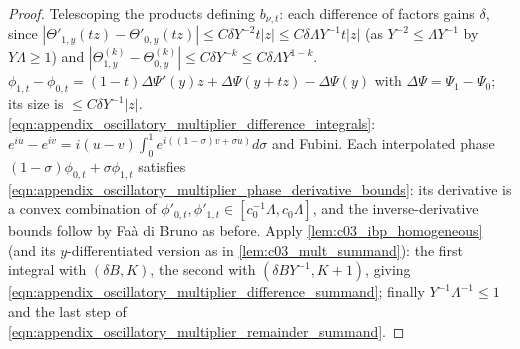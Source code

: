\begin{proof}
  Telescoping the products defining $b_{\nu,t}$: each difference of factors gains $\delta$, since $|\Theta'_{1,y}(tz)-\Theta'_{0,y}(tz)|\le C\delta Y^{-2}t|z|\le C\delta\Lambda Y^{-1}t|z|$ (as $Y^{-2}\le\Lambda Y^{-1}$ by $Y\Lambda\ge1$) and $|\Theta^{(k)}_{1,y}-\Theta^{(k)}_{0,y}|\le C\delta Y^{-k}\le C\delta\Lambda Y^{1-k}$.
  $\phi_{1,t}-\phi_{0,t}=(1-t)\Delta\Psi'(y)z+\Delta\Psi(y+tz)-\Delta\Psi(y)$ with $\Delta\Psi=\Psi_1-\Psi_0$; its size is $\le C\delta Y^{-1}|z|$.
  \eqref{eqn:appendix_oscillatory_multiplier_difference_integrals}: $e^{iu}-e^{iv}=i(u-v)\int_0^1e^{i((1-\sigma)v+\sigma u)}d\sigma$ and Fubini.
  Each interpolated phase $(1-\sigma)\phi_{0,t}+\sigma\phi_{1,t}$ satisfies \eqref{eqn:appendix_oscillatory_multiplier_phase_derivative_bounds}: its derivative is a convex combination of $\phi'_{0,t},\phi'_{1,t}\in[c_0^{-1}\Lambda,c_0\Lambda]$, and the inverse-derivative bounds follow by Fa\`a di Bruno as before.
  Apply \cref{lem:c03_ibp_homogeneous} (and its $y$-differentiated version as in \cref{lem:c03_mult_summand}): the first integral with $(\delta B,K)$, the second with $(\delta BY^{-1},K+1)$, giving \eqref{eqn:appendix_oscillatory_multiplier_difference_summand}; finally $Y^{-1}\Lambda^{-1}\le1$ and the last step of \eqref{eqn:appendix_oscillatory_multiplier_remainder_summand}.
\end{proof}

